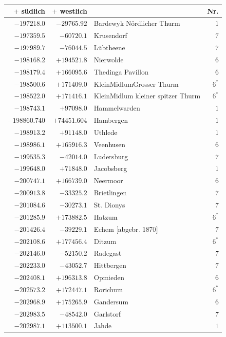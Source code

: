 \clearpage{}%
\begin{center}\begingroup\fontsize{8}{9}\selectfont
\setlength{\tabcolsep}{4pt}
\begin{tabular}{r|r|p{170pt}|r}\hline
\(+\) südlich&\(+\) westlich&&Nr.\\\hline
\(-197218.0\)&\(-29765.92\)&Bardewyk Nördlicher Thurm&\(1\)\\
\(-197359.5\)&\(-60720.1\)&Krusendorf&\(7\)\\
\(-197989.7\)&\(-76044.5\)&Lübtheene&\(7\)\\
\(-198168.2\)&\(+194521.8\)&Nierwolde&\(6\)\\
\(-198179.4\)&\(+166095.6\)&Thedinga Pavillon&\(6\)\\
\(-198500.6\)&\(+171409.0\)&KleinMidlumGrosser Thurm&\(6^{*}\)\\
\(-198522.0\)&\(+171416.1\)&KleinMidlum kleiner spitzer Thurm&\(6^{*}\)\\
\(-198743.1\)&\(+97098.0\)&Hammelwarden&\(1\)\\
\(-198860.740\)&\(+74451.604\)&Hambergen&\(1\)\\
\(-198913.2\)&\(+91148.0\)&Uthlede&\(1\)\\
\(-198986.1\)&\(+165916.3\)&Veenhusen&\(6\)\\
\(-199535.3\)&\(-42014.0\)&Ludersburg&\(7\)\\
\(-199648.0\)&\(+71848.0\)&Jacobsberg&\(1\)\\
\(-200747.1\)&\(+166739.0\)&Neermoor&\(6\)\\
\(-200913.8\)&\(-33325.2\)&Brietlingen&\(7\)\\
\(-201084.6\)&\(-30273.1\)&St. Dionys&\(7\)\\
\(-201285.9\)&\(+173882.5\)&Hatzum&\(6^{*}\)\\
\(-201426.4\)&\(-39229.1\)&Echem [abgebr. 1870]&\(7\)\\
\(-202108.6\)&\(+177456.4\)&Ditzum&\(6^{*}\)\\
\(-202146.0\)&\(-52150.2\)&Radegast&\(7\)\\
\(-202233.0\)&\(-43052.7\)&Hittbergen&\(7\)\\
\(-202408.1\)&\(+196313.8\)&Opmieden&\(6\)\\
\(-202573.2\)&\(+172447.1\)&Rorichum&\(6^{*}\)\\
\(-202968.9\)&\(+175265.9\)&Gandersum&\(6\)\\
\(-202983.5\)&\(-48542.0\)&Garlstorf&\(7\)\\
\(-202987.1\)&\(+113500.1\)&Jahde&\(1\)\\

\end{tabular}
\end{center}
